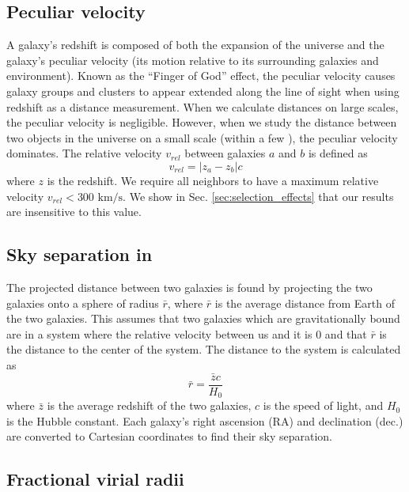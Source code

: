 \subsection{Peculiar velocity}

A galaxy's redshift is composed of both the expansion of the universe and the 
galaxy's peculiar velocity (its motion relative to its surrounding galaxies and 
environment).  Known as the ``Finger of God'' effect, the peculiar velocity 
causes galaxy groups and clusters to appear extended along the line of sight 
when using redshift as a distance measurement.  When we calculate distances on 
large scales, the peculiar velocity is negligible.  However, when we study the 
distance between two objects in the universe on a small scale (within a few 
\hMpc), the peculiar velocity dominates.  The relative velocity $v_{rel}$ 
between galaxies $a$ and $b$ is defined as
\begin{equation}
    v_{rel} = |z_a - z_b|c
\end{equation}
where $z$ is the redshift.  We require all 
neighbors to have a maximum relative velocity $v_{rel} < 300\text{ km/s}$.  We 
show in Sec. \ref{sec:selection_effects} that our results are insensitive to 
this value.


\subsection{Sky separation in \hMpc}

The projected distance between two galaxies is found by projecting the two 
galaxies onto a sphere of radius $\bar{r}$, where $\bar{r}$ is the average 
distance from Earth of the two galaxies.  This assumes that two galaxies which 
are gravitationally bound are in a system where the relative velocity between us 
and it is 0 and that $\bar{r}$ is the distance to the center of the system.  The 
distance to the system is calculated as
\begin{equation}
    \bar{r} = \frac{\bar{z}c}{H_0}
\end{equation}
where $\bar{z}$ is the average redshift of the two galaxies, $c$ is the speed of 
light, and $H_0$ is the Hubble constant.  Each galaxy's right ascension (RA) and 
declination (dec.) are converted to Cartesian coordinates to find their sky 
separation.


\subsection{Fractional virial radii}

